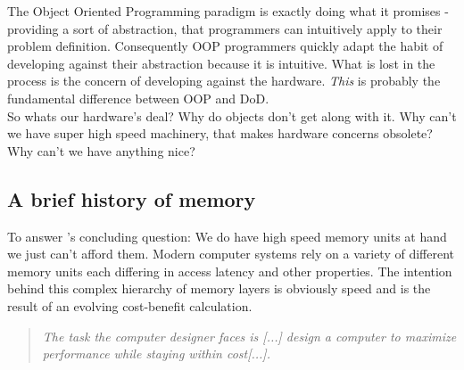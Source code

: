 The Object Oriented Programming paradigm is exactly doing what it promises - providing a sort of abstraction, that programmers can intuitively apply to their problem definition. Consequently OOP programmers quickly adapt the habit of developing against their abstraction because it is intuitive. What is lost in the process is the concern of developing against the hardware. \textit{This} is probably the fundamental difference between OOP and DoD.\\
So whats our hardware's deal? Why do objects don't get along with it. Why can't we have super high speed machinery, that makes hardware concerns obsolete? Why can't we have anything nice?

\subsection{A brief history of memory}
To answer 's concluding question: We do have high speed memory units at hand we just can't afford them. Modern computer systems rely on a variety of different memory units each differing in access latency and other properties. The intention behind this complex hierarchy of memory layers is obviously speed and is the result of an evolving cost-benefit calculation.
\begin{quote}
	\textit{The task the computer designer faces is [...] design a computer to maximize
		performance while staying within cost[...].}
\end{quote}


